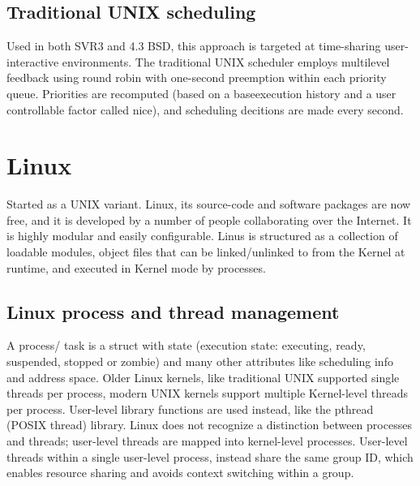 \subsection{Traditional UNIX scheduling}
Used in both SVR3 and 4.3 BSD, this approach is targeted at time-sharing user-interactive environments. The traditional UNIX scheduler employs multilevel feedback using round robin with one-second preemption within each priority queue. Priorities are recomputed (based on a baseexecution history and a user controllable factor called nice), and scheduling decitions are made every second.

\section{Linux}
Started as a UNIX variant. Linux, its source-code and software packages are now free, and it is developed by a number of people collaborating over the Internet. It is highly modular and easily configurable. Linus is structured as a collection of loadable modules, object files that can be linked/unlinked to from the Kernel at runtime, and executed in Kernel mode by processes.

\subsection{Linux process and thread management}
A process/ task is a struct with state (execution state: executing, ready, suspended, stopped or zombie) and many other attributes like scheduling info and address space.
Older Linux kernels, like traditional UNIX supported single threads per process, modern UNIX kernels support multiple Kernel-level threads per process. User-level library functions are used instead, like the pthread (POSIX thread) library.
Linux does not recognize a distinction between processes and threads; user-level threads are mapped into kernel-level processes. User-level threads within a single user-level process, instead share the same group ID, which enables resource sharing and avoids context switching within a group.

